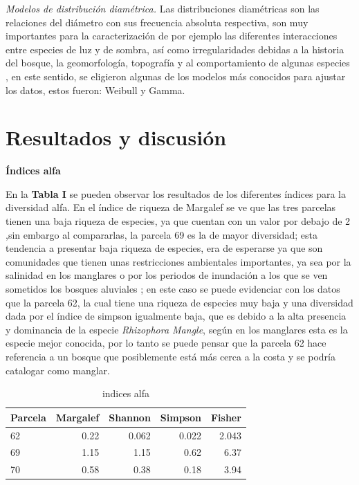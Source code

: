 \documentclass[conference,final,12pt,]{IEEEtran}
\begin{document}
\emph{Modelos de distribución diamétrica.} Las distribuciones
diamétricas son las relaciones del diámetro con sus frecuencia absoluta
respectiva, son muy importantes para la caracterización de por ejemplo
las diferentes interacciones entre especies de luz y de sombra, así como
irregularidades debidas a la historia del bosque, la geomorfología,
topografía y al comportamiento de algunas especies
\citep{AE}, en este sentido, se eligieron algunas de los
modelos más conocidos para ajustar los datos, estos fueron: Weibull y
Gamma.

\hypertarget{resultados-y-discusiuxf3n}{%
\section{Resultados y discusión}\label{resultados-y-discusiuxf3n}}

\textbf{Índices alfa} 

En la \textbf{Tabla I} se pueden observar los
resultados de los diferentes índices para la diversidad alfa. En el
índice de riqueza de Margalef se ve que las tres parcelas tienen una
baja riqueza de especies, ya que cuentan con un valor por debajo de 2
\citep{B},sin embargo al compararlas, la parcela 69 es la de mayor
diversidad; esta tendencia a presentar baja riqueza de especies, era de
esperarse ya que son comunidades que tienen unas restricciones
ambientales importantes, ya sea por la salinidad en los manglares
\citep{AD} o por los periodos de inundación a los que se ven sometidos
los bosques aluviales \citep{Z}; en este caso se puede evidenciar con los
datos que la parcela 62, la cual tiene una riqueza de especies muy baja
y una diversidad dada por el índice de simpson igualmente baja, que es
debido a la alta presencia y dominancia de la especie \emph{Rhizophora
Mangle}, según \citep{Z} en los manglares esta es la especie mejor
conocida, por lo tanto se puede pensar que la parcela 62 hace referencia
a un bosque que posiblemente está más cerca a la costa y se podría
catalogar como manglar.

\begin{table}[htb]

\caption{\label{tab:unnamed-chunk-2}indices alfa}
\centering
\begin{tabular}[t]{l|r|r|r|r}
\hline
Parcela & Margalef & Shannon & Simpson & Fisher\\
\hline
62 & 0.22 & 0.062 & 0.022 & 2.043\\
\hline
69 & 1.15 & 1.15 & 0.62 & 6.37\\
\hline
70 & 0.58 & 0.38 & 0.18 & 3.94\\
\hline
\end{tabular}
\end{table}
\end{document}
